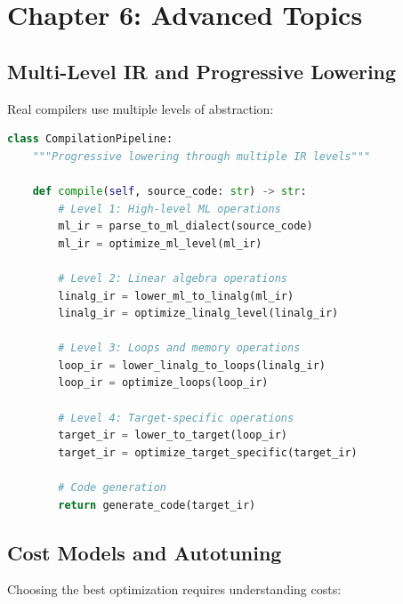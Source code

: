 \documentclass[11pt,a4paper]{article}
\begin{document}
\section{Chapter 6: Advanced Topics}

\subsection{Multi-Level IR and Progressive Lowering}

Real compilers use multiple levels of abstraction:

\begin{lstlisting}[language=Python, caption=Multi-Level Compilation Pipeline]
class CompilationPipeline:
    """Progressive lowering through multiple IR levels"""
    
    def compile(self, source_code: str) -> str:
        # Level 1: High-level ML operations
        ml_ir = parse_to_ml_dialect(source_code)
        ml_ir = optimize_ml_level(ml_ir)
        
        # Level 2: Linear algebra operations
        linalg_ir = lower_ml_to_linalg(ml_ir)
        linalg_ir = optimize_linalg_level(linalg_ir)
        
        # Level 3: Loops and memory operations
        loop_ir = lower_linalg_to_loops(linalg_ir)
        loop_ir = optimize_loops(loop_ir)
        
        # Level 4: Target-specific operations
        target_ir = lower_to_target(loop_ir)
        target_ir = optimize_target_specific(target_ir)
        
        # Code generation
        return generate_code(target_ir)
\end{lstlisting}

\subsection{Cost Models and Autotuning}

Choosing the best optimization requires understanding costs:
\end{document}
